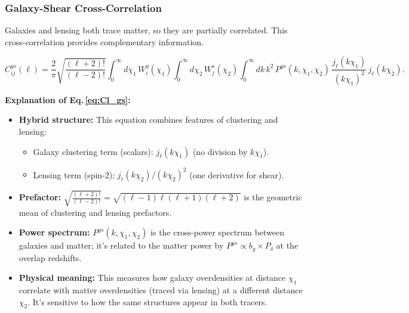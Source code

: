 \subsubsection{Galaxy-Shear Cross-Correlation}

Galaxies and lensing both trace matter, so they are partially correlated. This cross-correlation provides complementary information.

\begin{equation}
    C^{gs}_{ij}(\ell) = \frac{2}{\pi}\sqrt{\frac{(\ell+2)!}{(\ell-2)!}}
    \int_0^\infty d\chi_1\, W^g_i(\chi_1)
    \int_0^\infty d\chi_2\, W^s_j(\chi_2)
    \int_0^\infty dk\, k^2\, P^{gs}(k,\chi_1,\chi_2)\,
    \frac{j_\ell(k\chi_1)}{(k\chi_1)^2}\,j_\ell(k\chi_2).
    \label{eq:Cl_gs}
\end{equation}

\noindent\textbf{\large Explanation of Eq.\,\eqref{eq:Cl_gs}:}\\

\begin{itemize}[leftmargin=1.5cm]
    \item \textbf{Hybrid structure:} This equation combines features of clustering and lensing:
    \begin{itemize}
        \item Galaxy clustering term (scalars): $j_\ell(k\chi_1)$ (no division by $k\chi_1$).
        \item Lensing term (spin-2): $j_\ell(k\chi_2) / (k\chi_2)^2$ (one derivative for shear).
    \end{itemize}

    \item \textbf{Prefactor:} $\sqrt{\frac{(\ell+2)!}{(\ell-2)!}} = \sqrt{(\ell-1)\ell(\ell+1)(\ell+2)}$ is the geometric mean of clustering and lensing prefactors.

    \item \textbf{Power spectrum:} $P^{gs}(k,\chi_1,\chi_2)$ is the cross-power spectrum between galaxies and matter; it's related to the matter power by $P^{gs} \propto b_g \times P_\delta$ at the overlap redshifts.

    \item \textbf{Physical meaning:} This measures how galaxy overdensities at distance $\chi_1$ correlate with matter overdensities (traced via lensing) at a different distance $\chi_2$. It's sensitive to how the same structures appear in both tracers.
\end{itemize}

